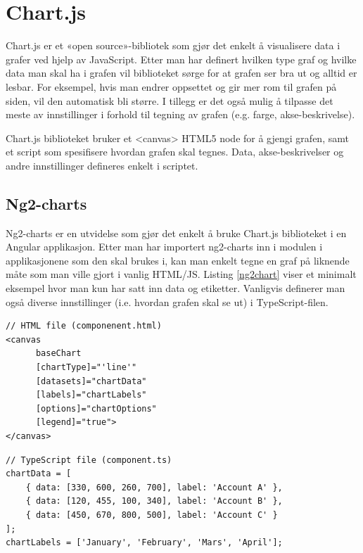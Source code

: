 \section{Chart.js}
Chart.js er et «open source»-bibliotek som gjør det enkelt å visualisere data i grafer ved hjelp av JavaScript. Etter man har definert hvilken type graf og hvilke data man skal ha i grafen vil biblioteket sørge for at grafen ser bra ut og alltid er lesbar. For eksempel, hvis man endrer oppsettet og gir mer rom til grafen på siden, vil den automatisk bli større. I tillegg er det også mulig å tilpasse det meste av innstillinger i forhold til tegning av grafen (e.g. farge, akse-beskrivelse).

Chart.js biblioteket bruker et <canvas> HTML5 node for å gjengi grafen, samt et script som spesifisere hvordan grafen skal tegnes. Data, akse-beskrivelser og andre innstillinger defineres enkelt i scriptet.

\subsection{Ng2-charts}
Ng2-charts er en utvidelse som gjør det enkelt å bruke Chart.js biblioteket i en Angular applikasjon. Etter man har importert ng2-charts inn i modulen i applikasjonene som den skal brukes i, kan man enkelt tegne en graf på liknende måte som man ville gjort i vanlig HTML/JS. Listing \ref{ng2chart} viser et minimalt eksempel hvor man kun har satt inn data og etiketter.  Vanligvis definerer man også diverse innstillinger (i.e. hvordan grafen skal se ut) i TypeScript-filen.

\begin{listing}[ht]
\begin{verbatim}
// HTML file (componenent.html)
<canvas
      baseChart
      [chartType]="'line'"
      [datasets]="chartData"
      [labels]="chartLabels"
      [options]="chartOptions"
      [legend]="true">
</canvas>
\end{verbatim}

\begin{verbatim}
// TypeScript file (component.ts)
chartData = [
    { data: [330, 600, 260, 700], label: 'Account A' },
    { data: [120, 455, 100, 340], label: 'Account B' },
    { data: [450, 670, 800, 500], label: 'Account C' }
];
chartLabels = ['January', 'February', 'Mars', 'April'];
\end{verbatim}
\caption{Minimalt Ng2-charts oppsett}
\label{ng2chart}
\end{listing}

